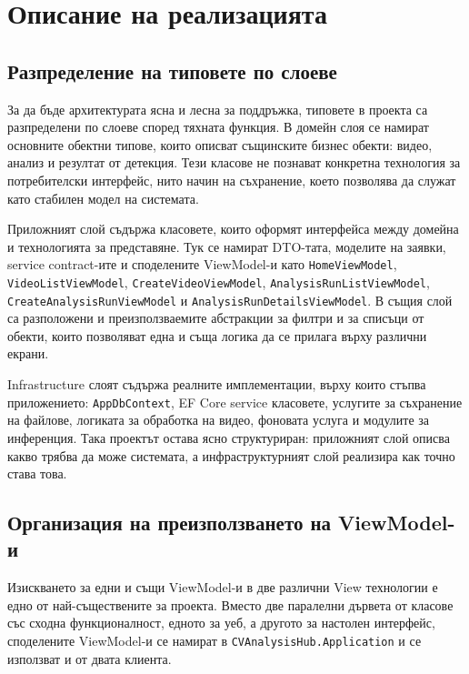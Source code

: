 \chapter{Описание на реализацията}

\section{Разпределение на типовете по слоеве}

За да бъде архитектурата ясна и лесна за поддръжка, типовете в проекта са разпределени по слоеве според тяхната функция. В домейн слоя се намират основните обектни типове, които описват същинските бизнес обекти: видео, анализ и резултат от детекция. Тези класове не познават конкретна технология за потребителски интерфейс, нито начин на съхранение, което позволява да служат като стабилен модел на системата.

Приложният слой съдържа класовете, които оформят интерфейса между домейна и технологията за представяне. Тук се намират DTO-тата, моделите на заявки, service contract-ите и споделените ViewModel-и като \texttt{HomeViewModel}, \texttt{VideoListViewModel}, \texttt{CreateVideoViewModel}, \texttt{AnalysisRunListViewModel}, \texttt{CreateAnalysisRunViewModel} и \texttt{AnalysisRunDetailsViewModel}. В същия слой са разположени и преизползваемите абстракции за филтри и за списъци от обекти, които позволяват една и съща логика да се прилага върху различни екрани.

Infrastructure слоят съдържа реалните имплементации, върху които стъпва приложението: \texttt{AppDbContext}, EF Core service класовете, услугите за съхранение на файлове, логиката за обработка на видео, фоновата услуга и модулите за инференция. Така проектът остава ясно структуриран: приложният слой описва какво трябва да може системата, а инфраструктурният слой реализира как точно става това.

\section{Организация на преизползването на ViewModel-и}

Изискването за едни и същи ViewModel-и в две различни View технологии е едно от най-съществените за проекта. Вместо две паралелни дървета от класове със сходна функционалност, едното за уеб, а другото за настолен интерфейс, споделените ViewModel-и се намират в \texttt{CVAnalysisHub.Application} и се използват и от двата клиента.

